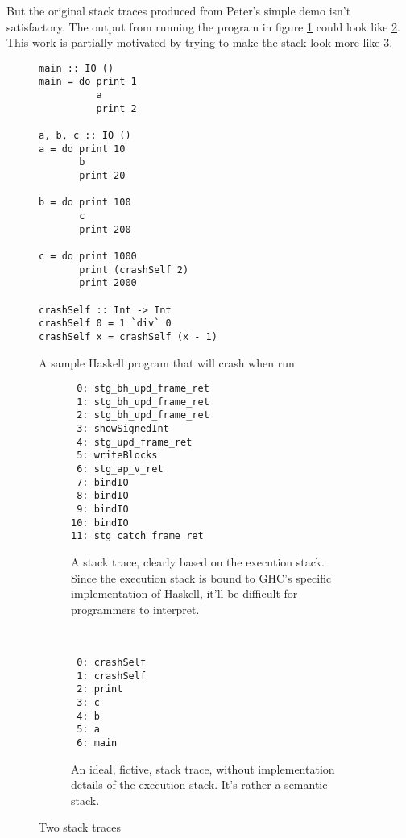 But the original stack traces produced from Peter's simple demo
isn't satisfactory. The output from running the program in figure
\ref{fig:sample_program} could look like \ref{fig:trace_goal1}. This
work is partially motivated by trying to make the stack look more like
\ref{fig:trace_goal2}.

\begin{figure}
\begin{mdframed}
  \begin{verbatim}
main :: IO ()
main = do print 1
          a
          print 2

a, b, c :: IO ()
a = do print 10
       b
       print 20

b = do print 100
       c
       print 200

c = do print 1000
       print (crashSelf 2)
       print 2000

crashSelf :: Int -> Int
crashSelf 0 = 1 `div` 0
crashSelf x = crashSelf (x - 1)
  \end{verbatim}
  \caption{A sample Haskell program that will crash when run}
  \label{fig:sample_program}
\end{mdframed}
\end{figure}




\begin{figure}
\begin{mdframed}
  \begin{subfigure}[t]{0.5\textwidth}
    {\small
    \begin{verbatim}
 0: stg_bh_upd_frame_ret
 1: stg_bh_upd_frame_ret
 2: stg_bh_upd_frame_ret
 3: showSignedInt
 4: stg_upd_frame_ret
 5: writeBlocks
 6: stg_ap_v_ret
 7: bindIO
 8: bindIO
 9: bindIO
10: bindIO
11: stg_catch_frame_ret
    \end{verbatim}
  }%
    \caption{A stack trace, clearly based on the execution stack. Since the
      execution stack is bound to GHC's specific implementation of Haskell,
      it'll be difficult for programmers to interpret.}
    \label{fig:trace_goal1}
  \end{subfigure}
        ~ %
        \begin{subfigure}[t]{0.5\textwidth}
    {\small
          \begin{verbatim}
 0: crashSelf
 1: crashSelf
 2: print
 3: c
 4: b
 5: a
 6: main
          \end{verbatim}
  }%
          \caption{An ideal, fictive, stack trace, without
          implementation details of the execution stack. It's rather a
          semantic stack.}
          \label{fig:trace_goal2}
        \end{subfigure}
        \caption{Two stack traces
        }\label{fig:traces}
\end{mdframed}
\end{figure}

